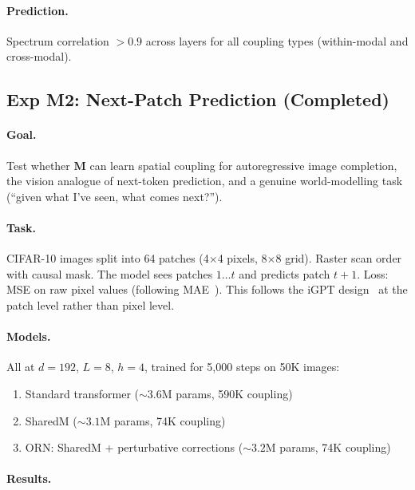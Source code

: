 \documentclass[11pt, a4paper]{article}
\newcommand{\M}{\mathbf{M}}
\theoremstyle{plain}
\theoremstyle{remark}
\begin{document}
\paragraph{Prediction.}
Spectrum correlation $> 0.9$ across layers for all coupling types (within-modal and cross-modal).

\subsection{Exp M2: Next-Patch Prediction (Completed)}

\paragraph{Goal.}
Test whether $\M$ can learn spatial coupling for autoregressive image completion, the vision analogue of next-token prediction, and a genuine world-modelling task (``given what I've seen, what comes next?'').

\paragraph{Task.}
CIFAR-10 images split into 64 patches (4$\times$4 pixels, 8$\times$8 grid).
Raster scan order with causal mask.
The model sees patches $1 \ldots t$ and predicts patch $t{+}1$.
Loss: MSE on raw pixel values (following MAE~\cite{he2022mae}).
This follows the iGPT design~\cite{chen2020igpt} at the patch level rather than pixel level.

\paragraph{Models.}
All at $d{=}192$, $L{=}8$, $h{=}4$, trained for 5{,}000 steps on 50K images:
\begin{enumerate}[nosep]
    \item Standard transformer (${\sim}3.6$M params, 590K coupling)
    \item SharedM (${\sim}3.1$M params, 74K coupling)
    \item ORN: SharedM + perturbative corrections (${\sim}3.2$M params, 74K coupling)
\end{enumerate}

\paragraph{Results.}
\end{document}
